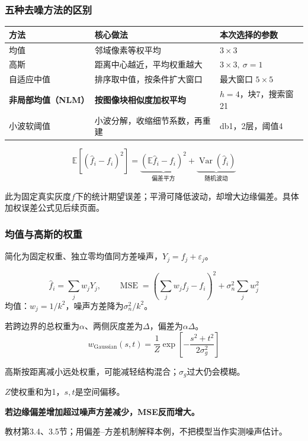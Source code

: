 \documentclass[11pt,aspectratio=169]{beamer}
\newcommand{\key}[1]{{\color{Accent}\bfseries #1}}
\newcommand{\source}[1]{\vfill{\fontsize{7.5}{9}\selectfont\color{Muted}#1\par}}
\begin{document}
\begin{frame}
\frametitle{五种去噪方法的区别}
{\small
\renewcommand{\arraystretch}{1.38}
\begin{tabular}{@{}>{\raggedright\arraybackslash}p{}>{\raggedright\arraybackslash}p{}>{\raggedright\arraybackslash}p{}@{}}
\toprule
方法 & 核心做法 & 本次选择的参数 \\
\midrule
均值 & 邻域像素等权平均 & $3\times3$ \\
高斯 & 距离中心越近，平均权重越大 & $3\times3,\ \sigma=1$ \\
自适应中值 & 排序取中值，按条件扩大窗口 & 最大窗口 $5\times5$ \\
\textbf{非局部均值（NLM）} & \textbf{按图像块相似度加权平均} & $h=4$，块7，搜索窗21 \\
小波软阈值 & 小波分解，收缩细节系数，再重建 & db1，2层，阈值4 \\
\bottomrule
\end{tabular}\par}
\[
\mathbb E[(\widehat f_i-f_i)^2]=
\underbrace{(\mathbb E\widehat f_i-f_i)^2}_{\text{偏差平方}}
+\underbrace{\operatorname{Var}(\widehat f_i)}_{\text{随机波动}}
\]
\source{此为固定真实灰度$f$下的统计期望误差；平滑可降低波动，却增大边缘偏差。具体加权误差公式见后续页面。}
\end{frame}

\begin{frame}
\frametitle{均值与高斯的权重}
{\small 简化为固定权重、独立零均值同方差噪声，$Y_j=f_j+\varepsilon_j$。}\par
\[
\widehat f_i=\sum_j w_jY_j,\qquad
\operatorname{MSE}=(\textstyle\sum_jw_jf_j-f_i)^2+\sigma_n^2\sum_jw_j^2
\]
均值：$w_j=1/k^2$，噪声方差降为$\sigma_n^2/k^2$。\par
若跨边界的总权重为$\alpha$、两侧灰度差为$\Delta$，偏差为$\alpha\Delta$。
\[
w_{\mathrm{Gaussian}}(s,t)=\frac1Z\exp\!\left[-\frac{s^2+t^2}{2\sigma_g^2}\right]
\]
{\small 高斯按距离减小远处权重，可能减轻结构混合；$\sigma_g$过大仍会模糊。\par
$Z$使权重和为1，$s,t$是空间偏移。}\par
\vspace{2mm}
\key{若边缘偏差增加超过噪声方差减少，MSE反而增大。}
\source{教材第3.4、3.5节；用偏差--方差机制解释本例，不把模型当作实测噪声估计。}
\end{frame}
\end{document}
